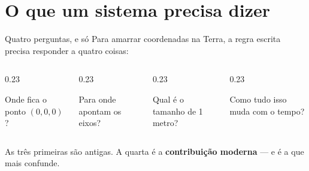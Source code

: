 \documentclass[aspectratio=169,11pt]{beamer}
\newcommand{\bnum}[1]{\textbf{\textcolor{mTeal}{#1}}}
\begin{document}
\section{O que um sistema precisa dizer}

\begin{frame}{Quatro perguntas, e só}
  Para amarrar coordenadas na Terra, a regra escrita precisa responder a quatro coisas:
  \bigskip
  \begin{columns}[T]
    \begin{column}{0.23\textwidth}
      \begin{regra}[title={1 · Origem}]
        \small Onde fica o ponto $(0,0,0)$?
      \end{regra}
    \end{column}
    \begin{column}{0.23\textwidth}
      \begin{regra}[title={2 · Orientação}]
        \small Para onde apontam os eixos?
      \end{regra}
    \end{column}
    \begin{column}{0.23\textwidth}
      \begin{regra}[title={3 · Escala}]
        \small Qual é o tamanho de 1 metro?
      \end{regra}
    \end{column}
    \begin{column}{0.23\textwidth}
      \begin{regra}[title={4 · Tempo}]
        \small Como tudo isso muda com o tempo?
      \end{regra}
    \end{column}
  \end{columns}
  \bigskip
  \centering
  As três primeiras são antigas. A quarta é a \bnum{contribuição moderna} --- e é a que
  mais confunde.
\end{frame}
\end{document}
